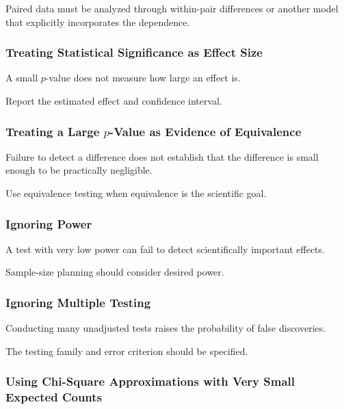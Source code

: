 Paired data must be analyzed through within-pair differences or another
model that explicitly incorporates the dependence.

\subsubsection{Treating Statistical Significance as Effect Size}

A small \(p\)-value does not measure how large an effect is.

Report the estimated effect and confidence interval.

\subsubsection{Treating a Large \(p\)-Value as Evidence of Equivalence}

Failure to detect a difference does not establish that the difference is
small enough to be practically negligible.

Use equivalence testing when equivalence is the scientific goal.

\subsubsection{Ignoring Power}

A test with very low power can fail to detect scientifically important
effects.

Sample-size planning should consider desired power.

\subsubsection{Ignoring Multiple Testing}

Conducting many unadjusted tests raises the probability of false
discoveries.

The testing family and error criterion should be specified.

\subsubsection{Using Chi-Square Approximations with Very Small Expected Counts}

